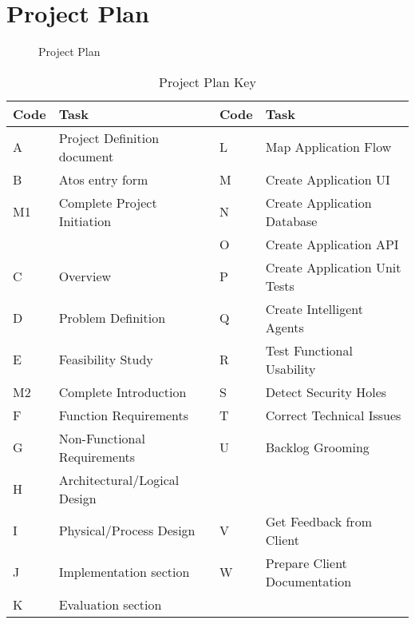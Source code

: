 \section{Project Plan}

\begin{figure}
  \centering
  \begin{minipage}{14cm}
    \centering
    
    \caption{Project Plan}
    \label{fig:project_plan}
  \end{minipage}
\end{figure}

\begin{table}
  \caption{Project Plan Key}
  \label{tab:runtime}
  \begin{tabular*}{14.0cm}{p{1.0cm}p{6.0cm}p{1.0cm}p{6.0cm}}
    \toprule
    Code & Task & Code & Task \\
    \midrule
    A & Project Definition document & L & Map Application Flow \\
    B & Atos entry form & M & Create Application UI \\
    M1 & Complete Project Initiation & N & Create Application Database \\
     & & O & Create Application API \\
    C & Overview & P & Create Application Unit Tests \\
    D & Problem Definition & Q & Create Intelligent Agents \\
    E & Feasibility Study & R & Test Functional Usability \\
    M2 & Complete Introduction & S & Detect Security Holes \\
    F & Function Requirements & T & Correct Technical Issues \\
    G & Non-Functional Requirements & U & Backlog Grooming \\
    H & Architectural/Logical Design & & \\
    I & Physical/Process Design & V & Get Feedback from Client \\
    J & Implementation section & W & Prepare Client Documentation \\
    K & Evaluation section \\
    \bottomrule
  \end{tabular*}
\end{table}
